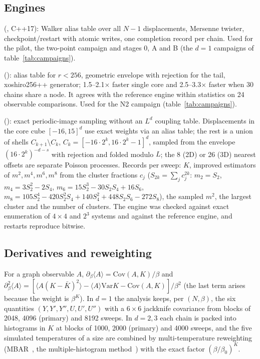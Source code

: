 \documentclass[10pt,a4paper]{article}
\begin{document}
\subsection{Engines}
\begin{description}[leftmargin=1.2em]
\item[$d=1$, reference engine] (, C++17): Walker alias table over all $N-1$ displacements, Mersenne twister,
 checkpoint/restart with atomic writes, one completion record per chain. Used for the pilot, the two-point campaign and stages 0, A and B (the $d=1$ campaigns of table~\ref{tab:campaigns}).
\item[$d=1$, specialized engine] (): alias table for $r<256$, geometric envelope with rejection for the tail,
 xoshiro256++ generator; 1.5--2.1$\times$ faster single core and 2.5--3.3$\times$ faster when 30 chains share a node. It agrees with the
 reference engine within statistics on 24 observable comparisons. Used for the N2 campaign (table~\ref{tab:campaigns}).
\item[$d=2,3$] (): exact periodic-image sampling without an $L^d$ coupling table. Displacements in the core
 cube $[-16,15]^d$ use exact weights via an alias table; the rest is a union of shells $C_{k+1}\setminus C_k$, $C_k=[-16\cdot2^k,16\cdot2^k-1]^d$,
 sampled from the envelope $(16\cdot2^k)^{-d-s}$ with rejection and folded modulo $L$; the 8 (2D) or 26 (3D) nearest offsets are separate
 Poisson processes. Records per sweep: $K$, improved estimators of $m^2,m^4,m^6,m^8$ from the cluster fractions $c_j$
 ($S_{2k}=\sum_jc_j^{2k}$: $m_2=S_2$, $m_4=3S_2^2-2S_4$, $m_6=15S_2^3-30S_2S_4+16S_6$,
 $m_8=105S_2^4-420S_2^2S_4+140S_4^2+448S_2S_6-272S_8$), the sampled $m^2$, the largest cluster and the number of clusters. The engine was
 checked against exact enumeration of $4\times4$ and $2^3$ systems and against the reference engine, and restarts reproduce bitwise.
\end{description}

\subsection{Derivatives and reweighting}
For a graph observable $A$, $\partial_\beta\langle A\rangle=\mathrm{Cov}(A,K)/\beta$ and
$\partial_\beta^2\langle A\rangle=[\langle A(K-\bar K)^2\rangle-\langle A\rangle\mathrm{Var}K-\mathrm{Cov}(A,K)]/\beta^2$ (the last term arises
because the weight is $\beta^K$). In $d=1$ the analysis keeps, per $(N,\beta)$, the six quantities $(Y,Y',Y'',U,U',U'')$ with a $6\times6$
jackknife covariance from blocks of 2048, 4096 (primary) and 8192 sweeps. In $d=2,3$ each chain is packed into histograms in $K$ at blocks of
1000, 2000 (primary) and 4000 sweeps, and the five simulated temperatures of a size are combined by multi-temperature reweighting
(MBAR~\cite{Shirts:2008xx}, the multiple-histogram method~\cite{Ferrenberg:1989ui}) with the exact factor $(\beta/\beta_0)^K$.
\end{document}
